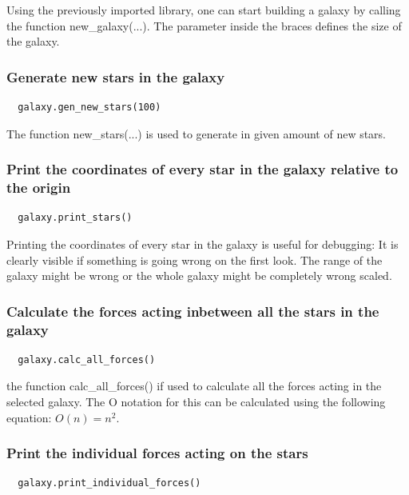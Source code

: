 Using the previously imported library, one can start building a galaxy by
calling the function new\_galaxy(...). The parameter inside the braces defines
the size of the galaxy.

\subsubsection{Generate new stars in the galaxy}

\begin{lstlisting}
  galaxy.gen_new_stars(100)
\end{lstlisting}

The function new\_stars(...) is used to generate in given amount of new stars.

\subsubsection{Print the coordinates of every star in the galaxy relative to
the origin}

\begin{lstlisting}
  galaxy.print_stars()
\end{lstlisting}

Printing the coordinates of every star in the galaxy is useful for debugging:
It is clearly visible if something is going wrong on the first look. The
range of the galaxy might be wrong or the whole galaxy might be completely
wrong scaled.

\subsubsection{Calculate the forces acting inbetween all the stars in the
galaxy}

\begin{lstlisting}
  galaxy.calc_all_forces()
\end{lstlisting}

the function calc\_all\_forces() if used to calculate all the forces acting
in the selected galaxy. The O notation for this can be calculated using the
following equation: \( O(n) = n^2 \).

\subsubsection{Print the individual forces acting on the stars}

\begin{lstlisting}
  galaxy.print_individual_forces()
\end{lstlisting}

